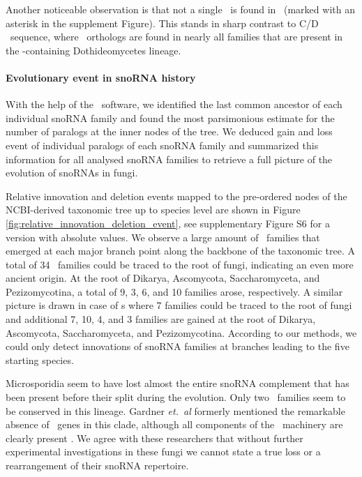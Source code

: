 Another noticeable observation is that not a single \haca\ is
found in \Ptt\ (marked with an asterisk in the supplement Figure). This stands in sharp contrast to C/D \sno\ sequence,
where \ptt\ orthologs are found in nearly all families that are
present in the \ptt-containing Dothideomycetes lineage.


\paragraph{\textbf{Evolutionary event in snoRNA history}}

With the help of the \epope\ software, we identified the last common ancestor of each individual snoRNA family and found the most parsimonious estimate for the number of paralogs at the inner nodes of the tree. 
We deduced gain and loss event of individual paralogs of each snoRNA family and summarized this information for all analysed snoRNA families to retrieve a full picture of the evolution of  snoRNAs in fungi.

Relative innovation and deletion events mapped to the pre-ordered
nodes of the NCBI-derived taxonomic tree up to species level are shown in
Figure \ref{fig:relative_innovation_deletion_event}, see supplementary Figure S6 for a version with absolute values.
We observe a large amount of \sno\ families that emerged at each
major branch point along the backbone of the taxonomic
tree. A total of 34 \cd\ families could be traced to the root of
fungi, indicating an even more ancient origin. At the root of 
Dikarya, Ascomycota, Saccharomyceta, and Pezizomycotina, a total
 of 9, 3, 6, and 10 families arose, respectively. A similar picture is drawn in
case of \haca s where 7 families could be traced to the root of
fungi and additional 7, 10, 4, and 3 families are gained at the root
of Dikarya, Ascomycota, Saccharomyceta, and Pezizomycotina. 
According to our methods, we could only detect innovations of snoRNA families at branches leading to the five starting species.  

Microsporidia seem to have lost almost the entire snoRNA complement that has been present before their split during the evolution. 
Only two \cd\ families seem to be conserved in this lineage. 
Gardner \emph{et.~al} formerly mentioned the remarkable absence of \sno\ genes in this clade, although all components of the \sno\ machinery are clearly present
\cite{Gardner:2010}. 
We agree with these researchers that without further experimental investigations in these fungi we cannot state a true loss or a rearrangement of their snoRNA repertoire. 

